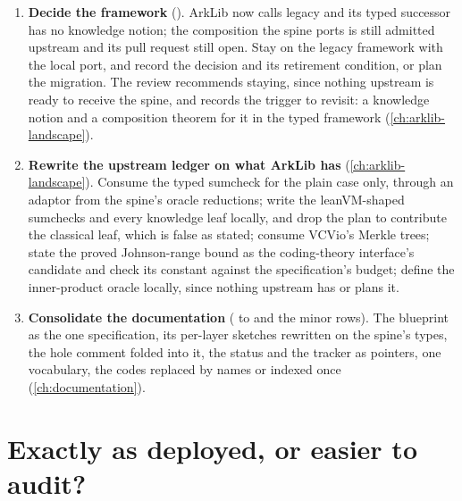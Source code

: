 \begin{enumerate}
  of the honest prover whenever its grind returns. The assumed interfaces restated for leanVM's
  constructions (one BLAKE2s map for the chain, the Merkle nodes and the grinding), or replaced
  by a plan to prove the chain lemma and the role-separation lemma; the list-binding
  compilation stated as the theorem it is. Cost: Layers 11 to 13 rewritten; the target theorem
  of  with them.
\item \textbf{Decide the framework} (). ArkLib now calls 
  legacy and its typed successor has no knowledge notion; the composition the spine ports is
  still admitted upstream and its pull request still open. Stay on the legacy framework with
  the local port, and record the decision and its retirement condition, or plan the migration.
  The review recommends staying, since nothing upstream is ready to receive the spine, and
  records the trigger to revisit: a knowledge notion and a composition theorem for it in the
  typed framework (\cref{ch:arklib-landscape}).
\item \textbf{Rewrite the upstream ledger on what ArkLib has} (\cref{ch:arklib-landscape}).
  Consume the typed sumcheck for the plain case only, through an adaptor from the spine's
  oracle reductions; write the leanVM-shaped sumchecks and every knowledge leaf locally, and
  drop the plan to contribute the classical leaf, which is false as stated; consume VCVio's
  Merkle trees; state the proved Johnson-range bound as the coding-theory interface's candidate
  and check its constant against the specification's budget; define the inner-product oracle
  locally, since nothing upstream has or plans it.
\item \textbf{Consolidate the documentation} ( to  and the minor rows).
  The blueprint as the one specification, its per-layer sketches rewritten on the spine's
  types, the hole comment folded into it, the status and the tracker as pointers, one
  vocabulary, the codes replaced by names or indexed once (\cref{ch:documentation}).
\end{enumerate}

\section{Exactly as deployed, or easier to audit?}\label{sec:opt-tradeoff}

